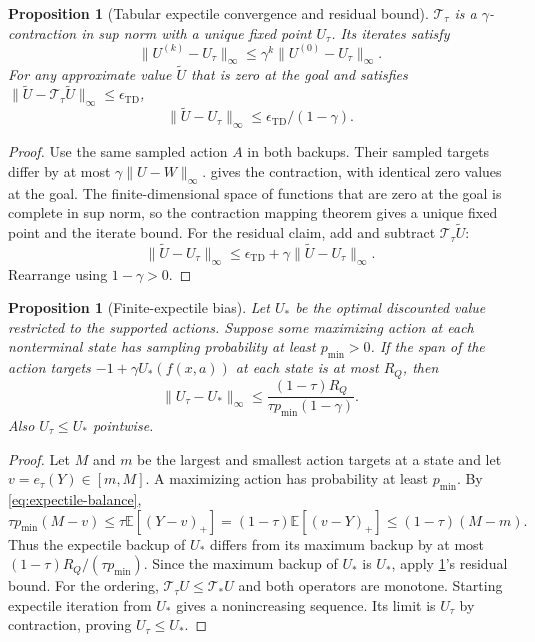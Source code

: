 \documentclass{article}
\newcommand{\EE}{\mathbb E}
\newtheorem{proposition}[theorem]{Proposition}
\theoremstyle{definition}
\theoremstyle{remark}
\begin{document}
\begin{proposition}[Tabular expectile convergence and residual bound]
\label{prop:expectile-contraction}
$\mathcal T_\tau$ is a $\gamma$-contraction in sup norm with a unique fixed point
$U_\tau$. Its iterates satisfy
\[
 \|U^{(k)}-U_\tau\|_\infty
     \le\gamma^k\|U^{(0)}-U_\tau\|_\infty .
\]
For any approximate value $\tilde U$ that is zero at the goal and satisfies
$\|\tilde U-\mathcal T_\tau\tilde U\|_\infty\le\epsilon_{\mathrm{TD}}$,
\begin{equation}
 \|\tilde U-U_\tau\|_\infty
       \le\epsilon_{\mathrm{TD}}/(1-\gamma).
 \label{eq:expectile-residual}
\end{equation}
\end{proposition}
\begin{proof}
Use the same sampled action $A$ in both backups.
Their sampled targets differ by at most $\gamma\|U-W\|_\infty$.
 gives the contraction, with identical zero values at the goal.
The finite-dimensional space of functions that are zero at the goal is complete in sup norm,
so the contraction mapping theorem gives a unique fixed point and the iterate bound.
For the residual claim, add and subtract $\mathcal T_\tau\tilde U$:
\[
 \|\tilde U-U_\tau\|_\infty
 \le\epsilon_{\mathrm{TD}}+\gamma\|\tilde U-U_\tau\|_\infty.
\]
Rearrange using $1-\gamma>0$.
\end{proof}

\begin{proposition}[Finite-expectile bias]
\label{prop:expectile-bias}
Let $U_*$ be the optimal discounted value restricted to the supported actions.
Suppose some maximizing action at each nonterminal state has sampling probability
at least $p_{\min}>0$. If the span of the action targets
$-1+\gamma U_*(f(x,a))$ at each state is at most $R_Q$, then
\begin{equation}
 \|U_\tau-U_*\|_\infty
 \le\frac{(1-\tau)R_Q}{\tau p_{\min}(1-\gamma)}.
 \label{eq:expectile-bias}
\end{equation}
Also $U_\tau\le U_*$ pointwise.
\end{proposition}
\begin{proof}
Let $M$ and $m$ be the largest and smallest action targets at a state and let
$v=e_\tau(Y)\in[m,M]$. A maximizing action has probability at least $p_{\min}$.
By \cref{eq:expectile-balance},
\[
 \tau p_{\min}(M-v)
 \le\tau\EE[(Y-v)_+]
 =(1-\tau)\EE[(v-Y)_+]
 \le(1-\tau)(M-m).
\]
Thus the expectile backup of $U_*$ differs from its maximum backup by at most
$(1-\tau)R_Q/(\tau p_{\min})$.
Since the maximum backup of $U_*$ is $U_*$, apply
\cref{prop:expectile-contraction}'s residual bound.
For the ordering, $\mathcal T_\tau U\le\mathcal T_*U$ and both operators are monotone.
Starting expectile iteration from $U_*$ gives a nonincreasing sequence.
Its limit is $U_\tau$ by contraction, proving $U_\tau\le U_*$.
\end{proof}
\end{document}
